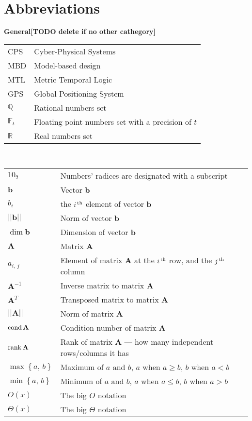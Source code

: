 \chapter*{Abbreviations}

{\bf General[TODO delete if no other cathegory]}\\

\begin{tabular}{ll}
CPS & Cyber-Physical Systems\\
MBD & Model-based design\\
MTL & Metric Temporal Logic\\
GPS & Global Positioning System\\
{$\mathbb Q$} & Rational numbers set\\
{$\mathbb F_t$} & Floating point numbers set with a precision of $t$\\
{$\mathbb R$} & Real numbers set
\end{tabular}
\vskip 1cm

\\

\begin{tabular}{ll}
$10_2$ & Numbers' radices are designated with a subscript \\
${\mathbf b}$ & Vector $\mathbf b$\\
$b_{i}$ & the $i^{\,{\rm th}}$ element of vector $\mathbf b$\\
${||\mathbf b||}$ & Norm of vector $\mathbf b$\\
$\dim \mathbf b$ & Dimension of vector $\mathbf b$\\
${\mathbf A}$ & Matrix $\mathbf A$\\
$a_{i,\,j}$ & Element of matrix $\mathbf A$ at the $i^{\,{\rm th}}$ row, and the $j^{\,{\rm th}}$ column\\
${\mathbf A^{-1}}$ & Inverse matrix to matrix $\mathbf A$\\
${\mathbf A^T}$ & Transposed matrix to matrix $\mathbf A$\\
${||\mathbf A||}$ & Norm of matrix $\mathbf A$\\
$\mathop{\mathrm{cond}}\nolimits \mathbf A$ & Condition number of matrix $\mathbf A$\\
$\mathop{\mathrm{rank}}\nolimits \mathbf A$ & Rank of matrix $\mathbf A$ --- how many independent rows/columns it has\\
$\max\left\{a,\,b\right\}$ & Maximum of $a$ and $b$, $a$ when $a\geq b$, $b$ when $a<b$\\
$\min\left\{a,\,b\right\}$ & Minimum of $a$ and $b$, $a$ when $a\leq b$, $b$ when $a>b$\\
$O(x)$ & The big $O$ notation\\
$\Theta(x)$ & The big $\Theta$ notation\\
\end{tabular}
\newpage

